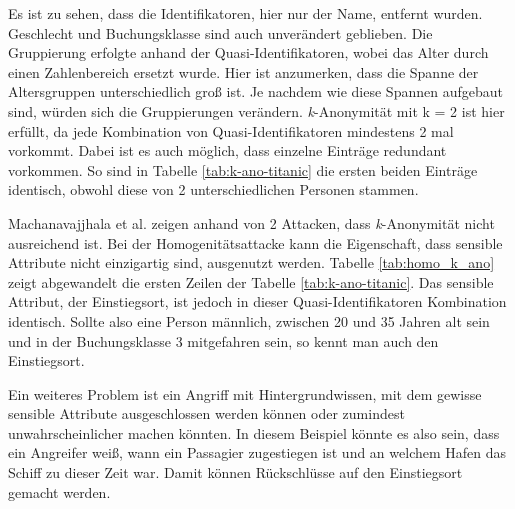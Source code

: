 

Es ist zu sehen, dass die Identifikatoren, hier nur der Name, entfernt wurden.
Geschlecht und Buchungsklasse sind auch unverändert geblieben.
Die Gruppierung erfolgte anhand der Quasi-Identifikatoren, wobei das Alter durch einen Zahlenbereich ersetzt wurde.
Hier ist anzumerken, dass die Spanne der Altersgruppen unterschiedlich groß ist. 
Je nachdem wie diese Spannen aufgebaut sind, würden sich die Gruppierungen verändern.
\textit{k}-Anonymität mit k = 2 ist hier erfüllt, da jede Kombination von Quasi-Identifikatoren mindestens 2 mal vorkommt.
Dabei ist es auch möglich, dass einzelne Einträge redundant vorkommen. 
So sind in Tabelle \ref{tab:k-ano-titanic} die ersten beiden Einträge identisch, obwohl diese von 2 unterschiedlichen Personen stammen.

Machanavajjhala et al. \cite{P-24} zeigen anhand von 2 Attacken, dass \textit{k}-Anonymität nicht ausreichend ist.
Bei der Homogenitätsattacke kann die Eigenschaft, dass sensible Attribute nicht einzigartig sind, ausgenutzt werden.
Tabelle \ref{tab:homo_k_ano} zeigt abgewandelt die ersten Zeilen der Tabelle \ref{tab:k-ano-titanic}.
Das sensible Attribut, der Einstiegsort, ist jedoch in dieser Quasi-Identifikatoren Kombination identisch.
Sollte also eine Person männlich, zwischen 20 und 35 Jahren alt sein und in der Buchungsklasse 3 mitgefahren sein, so kennt man auch den Einstiegsort.


Ein weiteres Problem ist ein Angriff mit Hintergrundwissen, mit dem gewisse sensible Attribute ausgeschlossen werden können oder zumindest unwahrscheinlicher machen könnten.
In diesem Beispiel könnte es also sein, dass ein Angreifer weiß, wann ein Passagier zugestiegen ist und an welchem Hafen das Schiff zu dieser Zeit war. 
Damit können Rückschlüsse auf den Einstiegsort gemacht werden.

